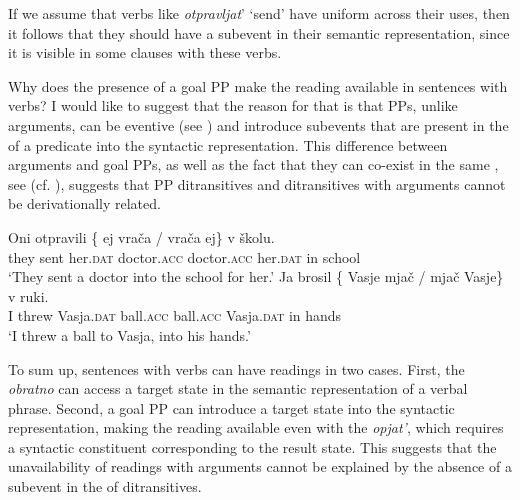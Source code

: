 \documentclass[output=paper]{langscibook}
\begin{document}
\noindent If we assume that  verbs like \textit{otpravljat}’ ‘send’ have uniform  across their uses, then it follows that they should have a  subevent in their semantic representation, since it is visible in some clauses with these verbs.

Why does the presence of a goal PP make the  reading available in sentences with  verbs? I would like to suggest that the reason for that is that PPs, unlike  arguments, can be eventive (see \citealt{McIntyre2006}) and introduce subevents that are present in the  of a predicate into the syntactic representation. This difference between  arguments and goal PPs, as well as the fact that they can co-exist in the same , see  (cf.  ), suggests that PP ditransitives and ditransitives with  arguments cannot be derivationally related.


 \ea\label{ex:bondarenko:25x}\ea\label{ex:bondarenko:25}
\gll Oni otpravili \{\hspace{-2pt} ej vrača / vrača ej\} v školu.\\
     they sent {} her.\textsc{dat} doctor.\textsc{acc} {} doctor.\textsc{acc} her.\textsc{dat} in school\\
\glt `They sent a doctor into the school for her.'
 \ex\label{ex:bondarenko:26}
\gll Ja brosil \{\hspace{-2pt} Vasje mjač / mjač Vasje\} v ruki.\\
     I threw {} Vasja.\textsc{dat} ball.\textsc{acc} {} ball.\textsc{acc} Vasja.\textsc{dat} in hands\\
\glt `I threw a ball to Vasja, into his hands.'
\z\z

 \ea\label{ex:bondarenko:27x}\label{ex:bondarenko:27}
\z\z


\noindent To sum up, sentences with   verbs can have  readings in two cases. First, the  \textit{obratno} can access a target state in the semantic representation of a verbal phrase. Second, a goal PP can introduce a target state into the syntactic representation, making the  reading available even with the   \textit{opjat’}, which requires a syntactic constituent corresponding to the result state. This suggests that the unavailability of  readings with  arguments cannot be explained by the absence of a  subevent in the  of  ditransitives.
\end{document}
